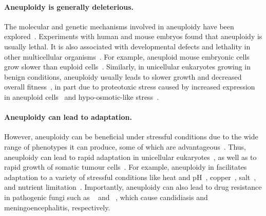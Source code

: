 \documentclass[12pt]{extarticle}
\begin{document}
\paragraph*{Aneuploidy is generally deleterious.}
The molecular and genetic mechanisms involved in aneuploidy have been explored~\citep{Musacchio2007, Sheltzer2011, Chen2012b, Rancati2013, Gerstein2015, Shor2015}.
Experiments with human and mouse embryos found that aneuploidy is usually lethal.
It is also associated with developmental defects and lethality in other multicellular organisms~\citep{Sheltzer2011}. For example, aneuploid mouse embryonic cells grow slower than euploid cells~\citep{Williams2008}.
Similarly, in unicellular eukaryotes growing in benign conditions, aneuploidy usually leads to slower growth and decreased overall fitness~\citep{Niwa2006, Torres2007, Pavelka2010, Sheltzer2011, Kasuga2016}, in part due to proteotoxic stress caused by increased expression in aneuploid cells~\citep{Pavelka2010, Santaguida2015, Zhu2018} and hypo-osmotic-like stress~\citep{Tsai2019}.

\paragraph*{Aneuploidy can lead to adaptation.}
However, aneuploidy can be beneficial under stressful conditions due to the wide range of phenotypes it can produce, some of which are advantageous~\citep{Pavelka2010}.
Thus, aneuploidy can lead to rapid adaptation in unicellular eukaryotes~\citep{Gerstein2015,Torres2010, Hong2014, Rancati2008}, as well as to rapid growth of somatic tumour cells~\citep{Schvartzman2010, Sheltzer2017}.
For example, aneuploidy in \yeast facilitates adaptation to a variety of stressful conditions like heat and pH~\citep{Yona2012}, copper~\citep{Covo2014, Gerstein2015}, salt~\citep{Dhar2011}, and nutrient limitation~\citep{Dunham2002, Gresham2008}.
Importantly, aneuploidy can also lead to drug resistance in pathogenic fungi such as \calbicans~\citep{Selmecki2008, Selmecki2010, Gerstein2018} and \cneoformans~\citep{Sionov2010}, which cause candidiasis and meningoencephalitis, respectively.
\end{document}
